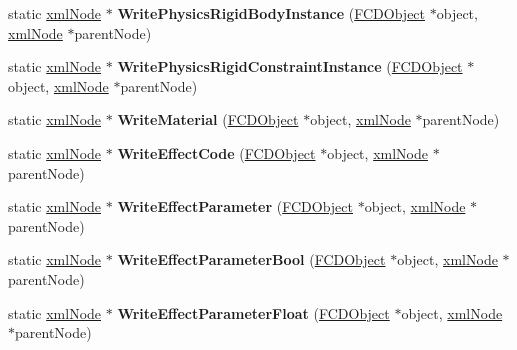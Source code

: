 \begin{DoxyCompactItemize}
\item 
\hypertarget{classFArchiveXML_a41b05d3777210a30a54e3df7adf70e66}{
static \hyperlink{struct__xmlNode}{xmlNode} $\ast$ {\bfseries WritePhysicsRigidBodyInstance} (\hyperlink{classFCDObject}{FCDObject} $\ast$object, \hyperlink{struct__xmlNode}{xmlNode} $\ast$parentNode)}
\label{classFArchiveXML_a41b05d3777210a30a54e3df7adf70e66}

\item 
\hypertarget{classFArchiveXML_a845d89ce4d972c6a6aca584142839d5a}{
static \hyperlink{struct__xmlNode}{xmlNode} $\ast$ {\bfseries WritePhysicsRigidConstraintInstance} (\hyperlink{classFCDObject}{FCDObject} $\ast$object, \hyperlink{struct__xmlNode}{xmlNode} $\ast$parentNode)}
\label{classFArchiveXML_a845d89ce4d972c6a6aca584142839d5a}

\item 
\hypertarget{classFArchiveXML_a587633d804ab70a3dc481b36e7777faf}{
static \hyperlink{struct__xmlNode}{xmlNode} $\ast$ {\bfseries WriteMaterial} (\hyperlink{classFCDObject}{FCDObject} $\ast$object, \hyperlink{struct__xmlNode}{xmlNode} $\ast$parentNode)}
\label{classFArchiveXML_a587633d804ab70a3dc481b36e7777faf}

\item 
\hypertarget{classFArchiveXML_a6eb2fb9f1669841c99e85ffffe4ddeac}{
static \hyperlink{struct__xmlNode}{xmlNode} $\ast$ {\bfseries WriteEffectCode} (\hyperlink{classFCDObject}{FCDObject} $\ast$object, \hyperlink{struct__xmlNode}{xmlNode} $\ast$parentNode)}
\label{classFArchiveXML_a6eb2fb9f1669841c99e85ffffe4ddeac}

\item 
\hypertarget{classFArchiveXML_af5e0b9d2642a61b4145338beb8b9ac24}{
static \hyperlink{struct__xmlNode}{xmlNode} $\ast$ {\bfseries WriteEffectParameter} (\hyperlink{classFCDObject}{FCDObject} $\ast$object, \hyperlink{struct__xmlNode}{xmlNode} $\ast$parentNode)}
\label{classFArchiveXML_af5e0b9d2642a61b4145338beb8b9ac24}

\item 
\hypertarget{classFArchiveXML_a206c5709c42abd2b8cedd16547b244ba}{
static \hyperlink{struct__xmlNode}{xmlNode} $\ast$ {\bfseries WriteEffectParameterBool} (\hyperlink{classFCDObject}{FCDObject} $\ast$object, \hyperlink{struct__xmlNode}{xmlNode} $\ast$parentNode)}
\label{classFArchiveXML_a206c5709c42abd2b8cedd16547b244ba}

\item 
\hypertarget{classFArchiveXML_aa2a03375ecc3203a35b9906cdfe26572}{
static \hyperlink{struct__xmlNode}{xmlNode} $\ast$ {\bfseries WriteEffectParameterFloat} (\hyperlink{classFCDObject}{FCDObject} $\ast$object, \hyperlink{struct__xmlNode}{xmlNode} $\ast$parentNode)}
\label{classFArchiveXML_aa2a03375ecc3203a35b9906cdfe26572}


\end{DoxyCompactItemize}

